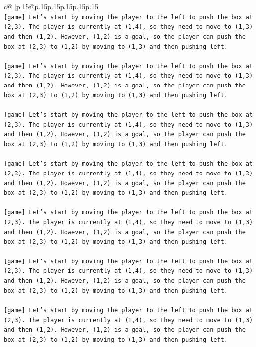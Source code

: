 \documentclass{article}
\begin{document}
{\begin{supertabular}{c@{$\;$}|p{.15\linewidth}@{}p{.15\linewidth}p{.15\linewidth}p{.15\linewidth}p{.15\linewidth}p{.15\linewidth}}
{{{\\ 
\texttt{{[}game{]} Let's start by moving the player to the left to push the box at (2,3). The player is currently at (1,4), so they need to move to (1,3) and then (1,2). However, (1,2) is a goal, so the player can push the box at (2,3) to (1,2) by moving to (1,3) and then pushing left.} \\
\\ 
\texttt{{[}game{]} Let's start by moving the player to the left to push the box at (2,3). The player is currently at (1,4), so they need to move to (1,3) and then (1,2). However, (1,2) is a goal, so the player can push the box at (2,3) to (1,2) by moving to (1,3) and then pushing left.} \\
\\ 
\texttt{{[}game{]} Let's start by moving the player to the left to push the box at (2,3). The player is currently at (1,4), so they need to move to (1,3) and then (1,2). However, (1,2) is a goal, so the player can push the box at (2,3) to (1,2) by moving to (1,3) and then pushing left.} \\
\\ 
\texttt{{[}game{]} Let's start by moving the player to the left to push the box at (2,3). The player is currently at (1,4), so they need to move to (1,3) and then (1,2). However, (1,2) is a goal, so the player can push the box at (2,3) to (1,2) by moving to (1,3) and then pushing left.} \\
\\ 
\texttt{{[}game{]} Let's start by moving the player to the left to push the box at (2,3). The player is currently at (1,4), so they need to move to (1,3) and then (1,2). However, (1,2) is a goal, so the player can push the box at (2,3) to (1,2) by moving to (1,3) and then pushing left.} \\
\\ 
\texttt{{[}game{]} Let's start by moving the player to the left to push the box at (2,3). The player is currently at (1,4), so they need to move to (1,3) and then (1,2). However, (1,2) is a goal, so the player can push the box at (2,3) to (1,2) by moving to (1,3) and then pushing left.} \\
\\ 
\texttt{{[}game{]} Let's start by moving the player to the left to push the box at (2,3). The player is currently at (1,4), so they need to move to (1,3) and then (1,2). However, (1,2) is a goal, so the player can push the box at (2,3) to (1,2) by moving to (1,3) and then pushing left.} \\
}}}
\end{supertabular}}
\end{document}
